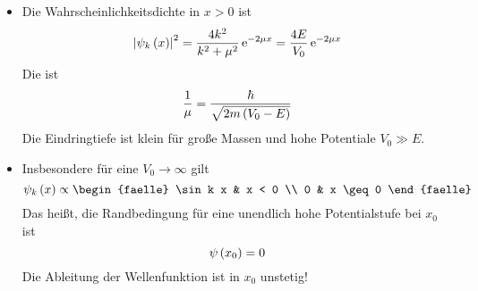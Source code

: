 \begin{itemize}
\begin{equation}
  \end{equation}
  \item Die Wahrscheinlichkeitsdichte in $x > 0$ ist 
  \begin{equation}
    \left\lvert \psi_k\left(x\right) \right\rvert^2 = \frac{4k^2}{k^2 + \mu^2} \, \text{e}^{-2\mu x} = \frac{4 E}{V_0} \, \text{e}^{-2\mu x}
  \end{equation}
  Die  ist
  \begin{equation}
    \frac{1}{\mu} = \frac{\hbar}{\sqrt{2m\left(V_0-E\right)}}
  \end{equation}
  Die Eindringtiefe ist klein für große Massen und hohe Potentiale $V_0 \gg E$.
  \item Insbesondere für eine  $V_0 \to \infty$ gilt
  \begin{equation}
    \psi_k\of{x} \propto \begin{faelle} \sin k x & x < 0 \\ 0 & x \geq 0 \end{faelle}
  \end{equation}
  Das heißt, die Randbedingung für eine unendlich hohe Potentialstufe bei $x_0$ ist 
  \begin{equation}
    \psi\left(x_0\right) = 0
  \end{equation}
  Die Ableitung der Wellenfunktion ist in $x_0$ unstetig!
\end{itemize}

